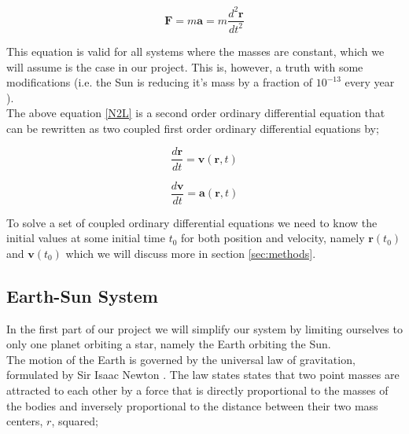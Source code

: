 \documentclass[12pt]{article}
\numberwithin{figure}{section}
\numberwithin{table}{section}
\begin{document}
\begin{equation}
	\label{N2L}
      \mathbf{F} = m\mathbf{a} = m \frac{d^2 \mathbf{r}}{dt^2}
\end{equation}

\noindent This equation is valid for all systems where the masses are constant, which we will assume is the case in our project. This is, however, a truth with some modifications (i.e. the Sun is reducing it's mass by a fraction of $10^{-13}$ every year \cite{solar}). \\

\noindent The above equation \eqref{N2L} is a second order ordinary differential equation that can be rewritten as two coupled first order ordinary differential equations \cite{Comp} by;



\begin{equation}
		\label{dr/dt}
         \frac{d\mathbf{r}}{dt}=\mathbf{v}(\mathbf{r},t)
\end{equation}

\begin{equation}
		\label{dv/dt}
         \frac{d \mathbf{v}}{dt} = \mathbf{a}(\mathbf{r}, t) 
\end{equation}



\noindent To solve a set of coupled ordinary differential equations we need to know the initial values at some initial time $t_0$ for both position and velocity, namely $\mathbf{r}(t_0)$ and $\mathbf{v}(t_0)$ which we will discuss more in section \ref{sec:methods}. \\







\subsection{Earth-Sun System}
\label{Earth-Sun}

\noindent In the first part of our project we will simplify our system by limiting ourselves to only one planet orbiting a star, namely the Earth orbiting the Sun.\\
 
\noindent The motion of the Earth is governed by the universal law of gravitation, formulated by Sir Isaac Newton \cite{newton-principia}. The law states states that two point masses are attracted to each other by a force that is directly proportional to the masses of the bodies and inversely proportional to the distance between their two mass centers, $r$, squared; 
\end{document}
